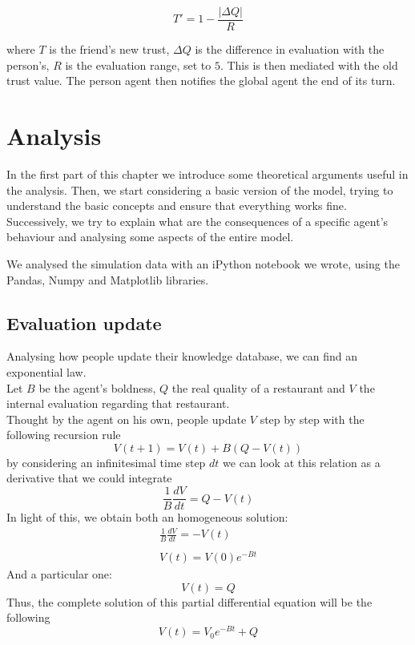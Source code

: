 \documentclass[10pt,a4paper,usenatbib]{article}
\begin{document}
\begin{equation*}
T' = 1 - \frac {\vert\Delta Q\vert}{R} 
\end{equation*}

where $T$ is the friend's new trust, $\Delta Q$ is the difference in evaluation with the person's, $R$ is the evaluation range, set to $5$. This is then mediated with the old trust value.
The person agent then notifies the global agent the end of its turn.

\section{Analysis}
In the first part of this chapter we introduce some theoretical arguments useful in the analysis. Then, we start considering a basic version of the model, trying to understand the basic concepts and ensure that everything works fine. Successively, we try to explain what are the consequences of a specific agent's behaviour and analysing some aspects of the entire model.   

We analysed the simulation data with an iPython notebook we wrote, using the Pandas, Numpy and Matplotlib libraries.

\subsection{Evaluation update}
\label{subsec:eval_update_rule}
Analysing how people update their knowledge database, we can find an exponential law.\\
Let $B$ be the agent's boldness, $Q$ the real quality of a restaurant and $V$ the internal evaluation regarding that restaurant. \\   
Thought by the agent on his own, people update $V$ step by step with the following recursion rule
\[V\left( {t + 1} \right) = V\left( t \right) + B\left( {Q - V\left( t \right)} \right)\]
by considering an infinitesimal time step $dt$ we can look at this relation as a derivative that we could integrate 
\[\frac{1}{B}\frac{{dV}}{{dt}} = Q - V\left( t \right)\]
In light of this, we obtain both an homogeneous solution:
\[\begin{array}{l}
\frac{1}{B}\frac{{dV}}{{dt}} =  - V\left( t \right)\\ \\
V\left( t \right) = V\left( 0 \right){e^{ - Bt}}
\end{array}\]	
And a particular one:
\[V\left( t \right) = Q\]
Thus, the complete solution of this partial differential equation will be the following
\[\boxed{V\left( t \right) = {V_0}{e^{-Bt}} + Q}\]
\end{document}
